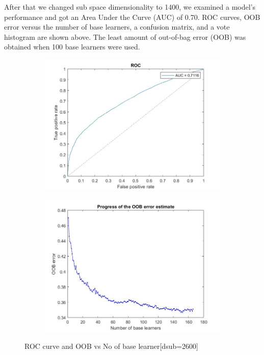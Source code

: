 \begin{flushleft}
After that we changed sub space dimensionality to 1400, we examined a model's performance and got an Area Under the Curve (AUC) of 0.70. ROC curves, OOB error versus the number of base learners, a confusion matrix, and a vote histogram are shown above. The least amount of out-of-bag error (OOB) was obtained when 100 base learners were used.
\end{flushleft}
\begin{figure}[H]
    \begin{subfigure}[b]{0.5\textwidth}
        \includegraphics[width=\textwidth]{img/2600/roc2600.jpg}
    \end{subfigure}
    \hfill
    \begin{subfigure}[b]{0.5\textwidth}
        \includegraphics[width=\textwidth]{img/2600/staturAATE2600.jpg}
    \end{subfigure}
    \caption{ROC curve and OOB vs No of base learner[dsub=2600]}
\end{figure}
